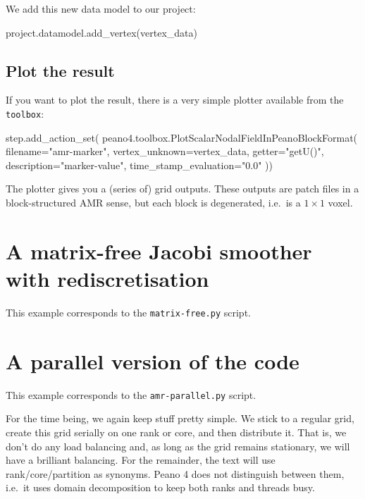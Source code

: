 \noindent
We add this new data model to our project:

\begin{code}
project.datamodel.add_vertex(vertex_data)
\end{code}



\subsection{Plot the result}

If you want to plot the result, there is a very simple plotter available from 
the \texttt{toolbox}:

\begin{code}
step.add_action_set( peano4.toolbox.PlotScalarNodalFieldInPeanoBlockFormat( 
  filename="amr-marker", 
  vertex_unknown=vertex_data,
  getter="getU()", 
  description="marker-value",
  time_stamp_evaluation="0.0"
))
\end{code}

\noindent
The plotter gives you a (series of) grid outputs.
These outputs are patch files in a block-structured AMR sense, but each block is degenerated, i.e.~is a $1\times 1 $ voxel.





\section{A matrix-free Jacobi smoother with rediscretisation}

\begin{remark}
 This example corresponds to the \texttt{matrix-free.py} script.
\end{remark}



\section{A parallel version of the code}

\begin{remark}
 This example corresponds to the \texttt{amr-parallel.py} script.
\end{remark}

For the time being, we again keep stuff pretty simple.
We stick to a regular grid, create this grid serially on one rank or core, 
and then distribute it.
That is, we don't do any load balancing and, as long as the grid remains 
stationary, we will have a brilliant balancing.
For the remainder, the text will use rank/core/partition as synonyms.
Peano 4 does not distinguish between them, i.e.~it uses domain decomposition
to keep both ranks and threads busy.


